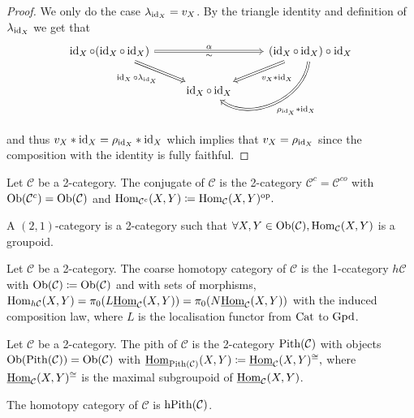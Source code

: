 \begin{proof}
	We only do the case $ \lambda_{\operatorname{id}_X}= v_X $.
	By the triangle identity and definition of $ \lambda_{ \operatorname{id}_X} $
	we get that 
	\[
	\begin{tikzcd}	
		\id_X \circ ( \id_X \circ \id_X )
		\ar[rr, Rightarrow, "\alpha", "\sim"']
		\ar[rd, Rightarrow, "\id_X \circ \lambda_{ \id_X}"']
		&&
		(\id_X \circ \id_X ) \circ \id_X
		\ar[dl, Rightarrow," v_X * \id_X"]
		\ar[dl, Rightarrow, bend left=60, " \rho_{\id_X} * \id_X"]
		\\
		&
		\id_X \circ \id_X
	\end{tikzcd}	
	\]
	and thus $ v_X * \operatorname{id}_X = \rho_{\operatorname{id}_X} * \operatorname{id}_X$ which implies that $v_X = \rho_{ \operatorname{id}_X}$ since the composition with the identity is fully faithful.
\end{proof}

\begin{defi}
	Let $\mathcal{ C }$ be a 2-category. The conjugate of $\mathcal{ C } $ is the 2-category $ \mathcal{C}^c = \mathcal{ C }^{co} $ with $\operatorname{Ob}( \mathcal{ C }^c ) = \operatorname{Ob} ( \mathcal{ C } )$ and $ \operatorname{Hom}_{ \mathcal{ C }^c} ( X , Y ) \coloneqq \operatorname{Hom}_{ \mathcal{ C } } ( X , Y )^{ \operatorname{op}}.$
\end{defi}

\begin{defi}
	A $ ( 2 ,1 )$-category is a 2-category such that $ \forall X, Y \in \operatorname{Ob} ( \mathcal{ C } ), \operatorname{Hom}_{ \mathcal{ C } } (X , Y) $ is a groupoid.
\end{defi}

\begin{defi}
	Let $ \mathcal{ C } $ be a 2-category. The coarse homotopy category of $\mathcal{C}$ is the 1-ccategory $h\mathcal{C}$ with $\operatorname{Ob} ( \mathcal{C } ) \coloneqq \operatorname{Ob}(\mathcal{ C } ) $ and with sets of morphisms, $ \operatorname{Hom}_{ h \mathcal{ C } }  ( X , Y ) = \pi_0 ( L \underline{ \operatorname{Hom} }_{ \mathcal{ C } } ( X , Y )) = \pi_0 ( N \underline{\operatorname{Hom}}_{\mathcal{ C } }( X , Y ))$ with the induced composition law, where $L$  is the localisation functor from $ \operatorname{Cat} $ to $\operatorname{Gpd}$.
\end{defi}

\begin{defi}
	Let $\mathcal{ C }$ be a 2-category.
	The pith of $ \mathcal{ C } $ is the 2-category $ \operatorname{Pith} ( \mathcal{ C } )$ with objects $ \operatorname{Ob} ( \operatorname{Pith} ( \mathcal{ C } ) )=\operatorname{Ob} ( \mathcal{ C } )$ with $\underline{ \operatorname{Hom} }_{ \operatorname{Pith} ( \mathcal{ C } ) } ( X, Y ) \coloneqq \underline{\operatorname{Hom}}_{ \mathcal{ C } } ( X , Y )^{ \cong } , $ where $ \underline{\operatorname{Hom}}_{ \mathcal{ C } } ( X , Y )^{ \cong } $ is the maximal subgroupoid of $\underline{\operatorname{Hom}}_{ \mathcal{ C } } ( X , Y ) $.
\end{defi}

\begin{defi}
	The homotopy category of $ \mathcal{ C } $ is $ \operatorname{hPith} ( \mathcal{ C } ) $.
\end{defi}
